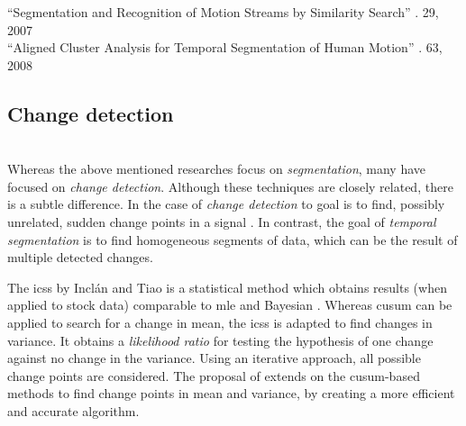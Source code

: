 
``Segmentation and Recognition of Motion Streams by Similarity Search'' \cite{li2007segmentation}. 29, 2007 \\





``Aligned Cluster Analysis for Temporal Segmentation of Human Motion'' \cite{zhou2008aligned}. 63, 2008 \\


\subsection{Change detection}\label{subsec:change_detection}
 \\
Whereas the above mentioned researches focus on \emph{segmentation}, many have focused on \emph{change detection}.
Although these techniques are closely related, there is a subtle difference.
In the case of \emph{change detection} to goal is to find, possibly unrelated, sudden change points in a signal \cite{takeuchi2006unifying}.
In contrast, the goal of \emph{temporal segmentation} is to find homogeneous segments of data, which can be the result of multiple detected changes.

The \gls{icss} by Incl\'{a}n and Tiao \cite{inclan1994use} is a statistical method which obtains results (when applied to stock data) comparable to \gls{mle} and Bayesian .
Whereas \gls{cusum} can be applied to search for a change in mean, the \gls{icss} is adapted to find changes in variance.
It obtains a \emph{likelihood ratio} for testing the hypothesis of one change against no change in the variance.
Using an iterative approach, all possible change points are considered.
The proposal of \cite{cheng2009efficient} extends on the \gls{cusum}-based methods to find change points in mean and variance, by creating a more efficient and accurate algorithm.

